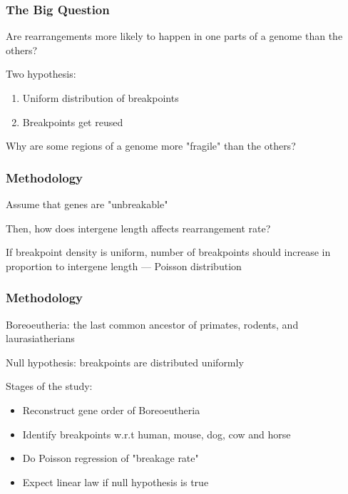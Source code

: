 \documentclass[svgnames,14pt]{beamer}
\begin{document}
\begin{frame}
\frametitle{The Big Question}
Are rearrangements more likely to happen in one parts of a genome than the others?
\pause

\vspace{12pt}
Two hypothesis:
\begin{enumerate}
\item Uniform distribution of breakpoints
\item Breakpoints get reused
\end{enumerate}
\pause 

\vspace{12pt}
{\color{Red} Why are some regions of a genome more "fragile" than the others?}
\end{frame}

\begin{frame}
\frametitle{Methodology}
Assume that genes are "unbreakable"

\vspace{12pt}
Then, how does intergene length affects rearrangement rate?

\vspace{12pt}
If breakpoint density is uniform, number of breakpoints should increase
in proportion to intergene length ---  Poisson distribution

\end{frame}

\begin{frame}
\frametitle{Methodology}
Boreoeutheria: the last common ancestor of primates, rodents, and laurasiatherians

\vspace{12pt}
Null hypothesis: breakpoints are distributed uniformly

\vspace{12pt}
Stages of the study:
\begin{itemize}
\item Reconstruct gene order of Boreoeutheria
\item Identify breakpoints w.r.t human, mouse, dog, cow and horse
\item Do Poisson regression of "breakage rate" 
\item Expect linear law if null hypothesis is true
\end{itemize}
\end{frame}
\end{document}
